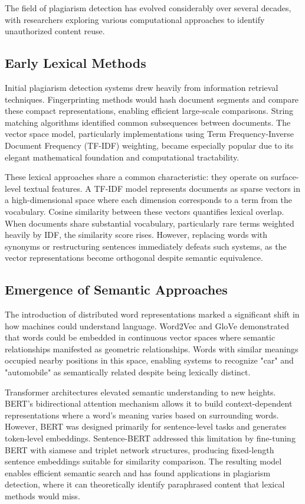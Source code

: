 \documentclass[conference]{IEEEtran}
\begin{document}
The field of plagiarism detection has evolved considerably over several decades, with researchers exploring various computational approaches to identify unauthorized content reuse.

\subsection{Early Lexical Methods}

Initial plagiarism detection systems drew heavily from information retrieval techniques. Fingerprinting methods would hash document segments and compare these compact representations, enabling efficient large-scale comparisons. String matching algorithms identified common subsequences between documents. The vector space model, particularly implementations using Term Frequency-Inverse Document Frequency (TF-IDF) weighting, became especially popular due to its elegant mathematical foundation and computational tractability.

These lexical approaches share a common characteristic: they operate on surface-level textual features. A TF-IDF model represents documents as sparse vectors in a high-dimensional space where each dimension corresponds to a term from the vocabulary. Cosine similarity between these vectors quantifies lexical overlap. When documents share substantial vocabulary, particularly rare terms weighted heavily by IDF, the similarity score rises. However, replacing words with synonyms or restructuring sentences immediately defeats such systems, as the vector representations become orthogonal despite semantic equivalence.

\subsection{Emergence of Semantic Approaches}

The introduction of distributed word representations marked a significant shift in how machines could understand language. Word2Vec and GloVe demonstrated that words could be embedded in continuous vector spaces where semantic relationships manifested as geometric relationships. Words with similar meanings occupied nearby positions in this space, enabling systems to recognize "car" and "automobile" as semantically related despite being lexically distinct.

Transformer architectures elevated semantic understanding to new heights. BERT's bidirectional attention mechanism allows it to build context-dependent representations where a word's meaning varies based on surrounding words. However, BERT was designed primarily for sentence-level tasks and generates token-level embeddings. Sentence-BERT addressed this limitation by fine-tuning BERT with siamese and triplet network structures, producing fixed-length sentence embeddings suitable for similarity comparison. The resulting model enables efficient semantic search and has found applications in plagiarism detection, where it can theoretically identify paraphrased content that lexical methods would miss.
\end{document}
